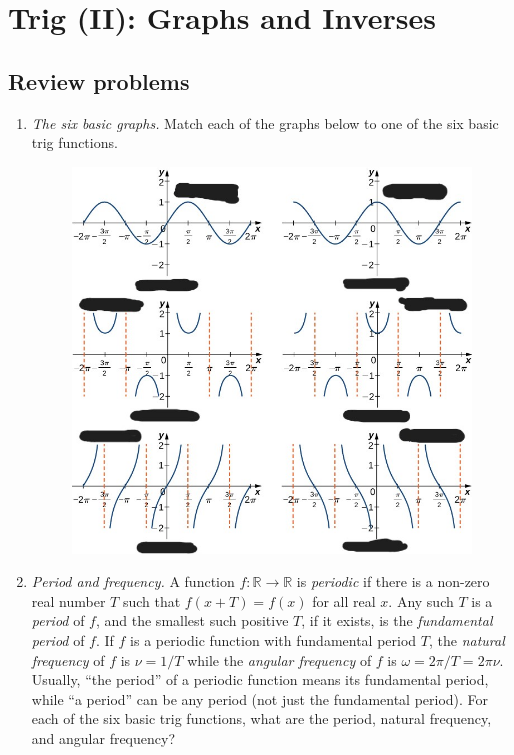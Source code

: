 \section{Trig (II): Graphs and Inverses}

\subsection{Review problems}

\begin{enumerate}
\item \emph{The six basic graphs.} Match each of the graphs below to one of the six basic trig functions.
\begin{figure}[H]
\centering
\includegraphics[scale=0.7]{img-trig-graphs.jpg}
\end{figure}
\item \emph{Period and frequency.} A function $f:\mathbb{R}\to\mathbb{R}$ is \emph{periodic} if there is a non-zero real number $T$ such that $f(x + T) = f(x)$ for all real $x$. Any such $T$ is a \emph{period} of $f$, and the smallest such positive $T$, if it exists, is the \emph{fundamental period} of $f$. If $f$ is a periodic function with fundamental period $T$, the \emph{natural frequency} of $f$ is $\nu = 1/T$ while the \emph{angular frequency} of $f$ is $\omega = 2\pi/T = 2\pi\nu$. Usually, ``the period'' of a periodic function means its fundamental period, while ``a period'' can be any period (not just the fundamental period). For each of the six basic trig functions, what are the period, natural frequency, and angular frequency?

\end{enumerate}
